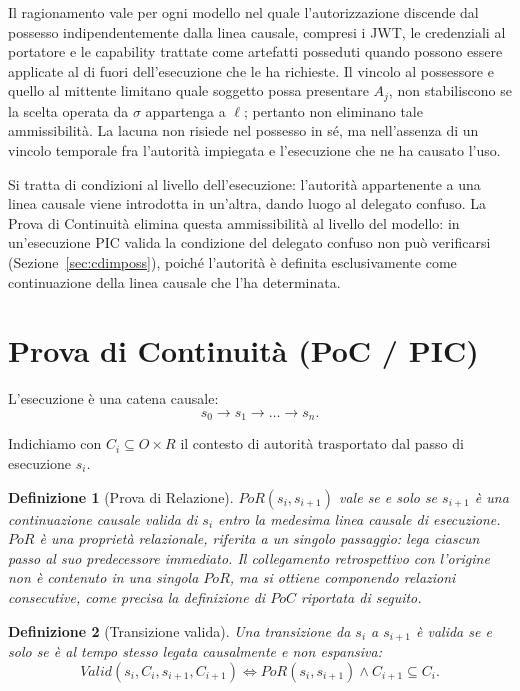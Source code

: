 \documentclass[11pt]{article}
\newtheorem{definition}{Definizione}
\begin{document}
Il ragionamento vale per ogni modello nel quale l'autorizzazione discende dal
possesso indipendentemente dalla linea causale, compresi i JWT, le credenziali
al portatore e le capability trattate come artefatti posseduti quando possono
essere applicate al di fuori dell'esecuzione che le ha richieste. Il vincolo al
possessore e quello al mittente limitano quale soggetto possa presentare $A_j$,
non stabiliscono se la scelta operata da $\sigma$ appartenga a $\ell$; pertanto
non eliminano tale ammissibilità. La lacuna non risiede nel possesso in sé, ma
nell'assenza di un vincolo temporale fra l'autorità impiegata e l'esecuzione che
ne ha causato l'uso.

Si tratta di condizioni al livello dell'esecuzione: l'autorità appartenente a
una linea causale viene introdotta in un'altra, dando luogo al delegato confuso.
La Prova di Continuità elimina questa ammissibilità al livello del modello: in
un'esecuzione PIC valida la condizione del delegato confuso non può verificarsi
(Sezione~\ref{sec:cdimposs}), poiché l'autorità è definita esclusivamente come
continuazione della linea causale che l'ha determinata.

\section{Prova di Continuità (PoC / PIC)}
\label{sec:poc}

L'esecuzione è una catena causale:
\[
s_0 \rightarrow s_1 \rightarrow \dots \rightarrow s_n.
\]

Indichiamo con $C_i \subseteq O \times R$ il contesto di autorità trasportato dal
passo di esecuzione $s_i$.

\begin{definition}[Prova di Relazione]
$PoR(s_i, s_{i+1})$ vale se e solo se $s_{i+1}$ è una continuazione causale
valida di $s_i$ entro la medesima linea causale di esecuzione. $PoR$ è una
proprietà \emph{relazionale}, riferita a un singolo passaggio: lega ciascun
passo al suo predecessore immediato. Il collegamento retrospettivo con l'origine
non è contenuto in una singola $PoR$, ma si ottiene componendo relazioni
consecutive, come precisa la definizione di $PoC$ riportata di seguito.
\end{definition}

\begin{definition}[Transizione valida]
Una transizione da $s_i$ a $s_{i+1}$ è valida se e solo se è al tempo stesso
legata causalmente e non espansiva:
\[
Valid(s_i,C_i,s_{i+1},C_{i+1})
\Longleftrightarrow
PoR(s_i,s_{i+1}) \land C_{i+1}\subseteq C_i.
\]
\end{definition}
\end{document}
